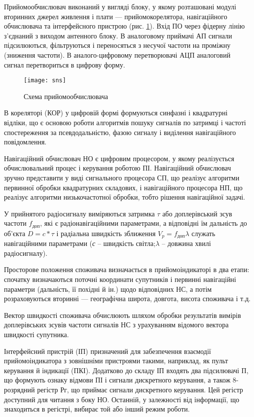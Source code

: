 Прийомообчислювач виконаний у вигляді блоку, у якому розташовані модулі вторинних 
джерел живлення і плати --- прийомокорелятора, навігаційного обчислювача та інтерфейсного 
пристрою (рис. \ref{fig:sns}). Вхід ПО через фідерну лінію з'єднаний з виходом антенного блоку. 
В аналоговому приймачі АП сигнали підсилюються, фільтруються і переносяться з несучої 
частоти на проміжну (зниження частоти). В аналого-цифровому перетворювачі АЦП аналоговий 
сигнал перетвориться в цифрову форму.
\begin{figure}[here]
\centering
\texttt{[image: sns]}
\caption{Схема прийомообчислювача}
\label{fig:sns}
\end{figure} 
В кореляторі (КОР) у цифровій формі формуються синфазні  і квадратурні  відліки, що є 
основою роботи алгоритмів пошуку сигналів по затримці і частоті спостереження за псевдодальністю, 
фазою сигналу і виділення навігаційного повідомлення.

Навігаційний обчислювач НО є цифровим процесором, у якому реалізується обчислювальний процес 
і керування роботою ПІ. Навігаційний обчислювач зручно представити у виді сигнального процесора 
СП, що реалізує алгоритми первинної обробки квадратурних складових, і навігаційного процесора 
НП, що реалізує алгоритми низькочастотної обробки, тобто рішення навігаційної задачі.

У прийнятого радіосигналу виміряються затримка $\tau$ або доплерівський зсув частоти $f_{\text{доп}}$, 
які є радіонавігаційними параметрами, а відповідні їм дальність до об'єкта $D=c*\tau$  
і радіальна швидкість зближення $V_{p}=f_{\text{доп}}\lambda$   служать навігаційними параметрами 
(\textit{с } -- швидкість світла;$\lambda$ -- довжина хвилі радіосигналу).

Просторове положення споживача визначається в прийомоіндикаторі в два етапи: спочатку визначаються 
поточні координати супутників і первинні навігаційні параметри (дальність, її похідні й ін.) щодо 
відповідних НС, а потім розраховуються вторинні --- географічна широта, довгота, висота споживача і т.д.

Вектор швидкості споживача обчислюють шляхом обробки результатів вимірів доплерівських зсувів 
частоти сигналів НС з урахуванням відомого вектора швидкості супутника. 

Інтерфейсний пристрій (ІП) призначений для забезпечення взаємодії прийомоіндикатора з зовнішніми 
пристроями такими, наприклад, як пульт керування й індикації (ПКІ). Додатково до складу ІП входять 
два підсилювачі П, що формують ознаку відмови ПІ і сигнали дискретного керування, а також 8-розрядний 
регістр Рг, що приймає сигнали дискретного керування. Цей регістр доступний для читання з боку НО. 
Останній, у залежності від інформації, що знаходиться в регістрі, вибирає той або інший режим роботи.

